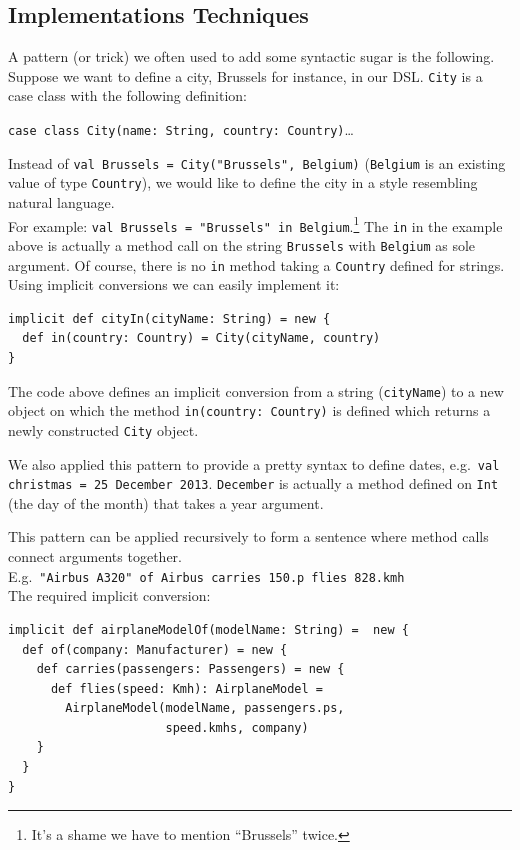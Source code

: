 \documentclass[a4paper]{article}
\newcommand{\cc}[1]{\texttt{#1}}
\renewcommand{\sc}[1]{\lstinline{#1}}
\begin{document}
\subsection{Implementations Techniques}
\label{sec:implementation-techniques}

A pattern (or trick) we often used to add some syntactic sugar is the following.
Suppose we want to define a city, Brussels for instance, in our DSL.\@
\cc{City} is a case class with the following definition:

\sc{case class City(name: String, country: Country)}\ldots{}

Instead of \sc{val Brussels = City("Brussels", Belgium)} (\cc{Belgium} is an existing value of type \cc{Country}), we would like to define the city in a style resembling natural language.\\
For example: \sc{val Brussels = "Brussels" in Belgium}.\footnote{It's a shame we have to mention ``Brussels'' twice.}
The \sc{in} in the example above is actually a method call on the string \cc{Brussels} with \cc{Belgium} as sole argument.
Of course, there is no \sc{in} method taking a \cc{Country} defined for strings.
Using implicit conversions we can easily implement it:

\begin{lstlisting}
implicit def cityIn(cityName: String) = new {
  def in(country: Country) = City(cityName, country)
}
\end{lstlisting}

The code above defines an implicit conversion from a string (\sc{cityName}) to a new object on which the method \sc{in(country: Country)} is defined which returns a newly constructed \cc{City} object.

We also applied this pattern to provide a pretty syntax to define dates, e.g.\ \sc{val christmas = 25 December 2013}.
\cc{December} is actually a method defined on \cc{Int} (the day of the month) that takes a year argument.

This pattern can be applied recursively to form a sentence where method calls connect arguments together.\\
E.g.\ \sc{"Airbus A320" of Airbus carries 150.p flies 828.kmh}\\
The required implicit conversion:

\begin{lstlisting}
implicit def airplaneModelOf(modelName: String) =  new {
  def of(company: Manufacturer) = new {
    def carries(passengers: Passengers) = new {
      def flies(speed: Kmh): AirplaneModel =
        AirplaneModel(modelName, passengers.ps,
                      speed.kmhs, company)
    }
  }
}
\end{lstlisting}
\end{document}
